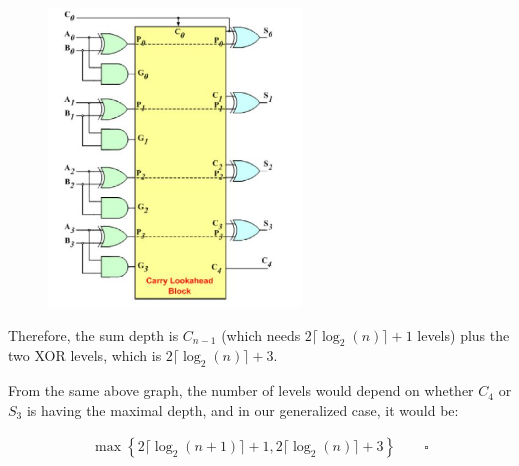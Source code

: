 \documentclass{article}
\begin{document}
\begin{figure}[H]
    \centering
    \includegraphics[width=0.6\textwidth]{7_sum.jpg}
\end{figure}

Therefore, the sum depth is $C_{n-1}$ (which needs $2\lceil \log_2(n) \rceil + 1$ levels)
plus the two XOR levels, which is $2\lceil \log_2(n) \rceil + 3$.
\bigskip

From the same above graph, the number of levels 
would depend on whether $C_4$ or $S_3$ is having the maximal depth,
and in our generalized case, it would be:

\begin{align*}
    \max \left\{ 2 \lceil \log_2(n+1) \rceil + 1, 2 \lceil \log_2(n) \rceil + 3 \right\} \qquad \square
\end{align*}
\end{document}
